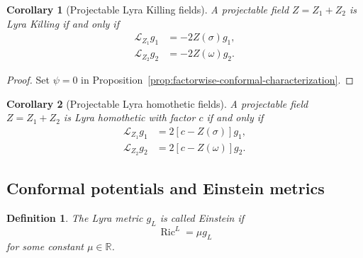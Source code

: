 \documentclass[a4paper,11pt]{article}
\theoremstyle{plain}
\newtheorem{definition}{Definition}[section]
\newtheorem{corollary} {Corollary}[section]
\numberwithin{equation}{section}
\begin{document}
\begin{corollary}[Projectable Lyra Killing fields]
	\label{cor:projectable-lyra-killing}
	A projectable field \(Z=Z_{1}+Z_{2}\) is Lyra Killing if and
	only if
	\begin{subequations}
		\label{eq:factorwise-killing-system}
		\begin{align}
			\mathcal L_{Z_{1}}g_{1}
			&=
			-2Z(\sigma)g_{1},
			\label{eq:base-killing-system}
			\\
			\mathcal L_{Z_{2}}g_{2}
			&=
			-2Z(\omega)g_{2}.
			\label{eq:fiber-killing-system}
		\end{align}
	\end{subequations}
\end{corollary}

\begin{proof}
	Set \(\psi=0\) in
	Proposition~\ref{prop:factorwise-conformal-characterization}.
\end{proof}

\begin{corollary}[Projectable Lyra homothetic fields]
	\label{cor:projectable-lyra-homothetic}
	A projectable field \(Z=Z_{1}+Z_{2}\) is Lyra homothetic with
	factor \(c\) if and only if
	\begin{subequations}
		\label{eq:factorwise-homothetic-system}
		\begin{align}
			\mathcal L_{Z_{1}}g_{1}
			&=
			2\left[
			c-Z(\sigma)
			\right]g_{1},
			\label{eq:base-homothetic-system}
			\\
			\mathcal L_{Z_{2}}g_{2}
			&=
			2\left[
			c-Z(\omega)
			\right]g_{2}.
			\label{eq:fiber-homothetic-system}
		\end{align}
	\end{subequations}
\end{corollary}

\subsection{Conformal potentials and Einstein metrics}
\label{subsec:conformal-einstein-equivalence}

\begin{definition}
	\label{def:lyra-einstein-metric}
	The Lyra metric \(g_{L}\) is called \emph{Einstein} if
	\begin{equation}
		\operatorname{Ric}^{L}
		=
		\mu g_{L}
		\label{eq:lyra-einstein-condition}
	\end{equation}
	for some constant \(\mu\in\mathbb R\).
\end{definition}
\end{document}
